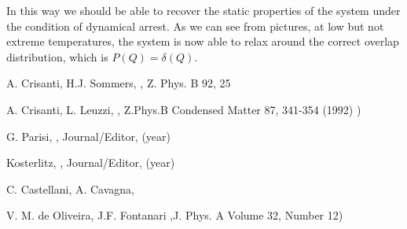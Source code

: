 \documentclass{article}
\begin{document}
In this way we should be able to recover the static properties of the system under the condition of dynamical arrest.
As we can see from pictures, at low but not extreme temperatures, the system is now able to relax around the correct overlap distribution, which is $P(Q) = \delta(Q)$. 







{\newpage}

{\newpage}




\begin{thebibliography}{99}

  {A. Crisanti, H.J. Sommers, {}, Z. Phys. B 92, 25%


  {A. Crisanti, L. Leuzzi, {},  Z.Phys.B Condensed Matter 87, 341-354 (1992) )}


  {G. Parisi, {}, Journal/Editor, (year)}


  {}Kosterlitz, {}, Journal/Editor, (year)}


  {C. Castellani, A. Cavagna, {}}

   { V. M. de Oliveira, J.F. Fontanari {},J. Phys. A Volume 32, Number 12)}

\end{thebibliography}
\end{document}

